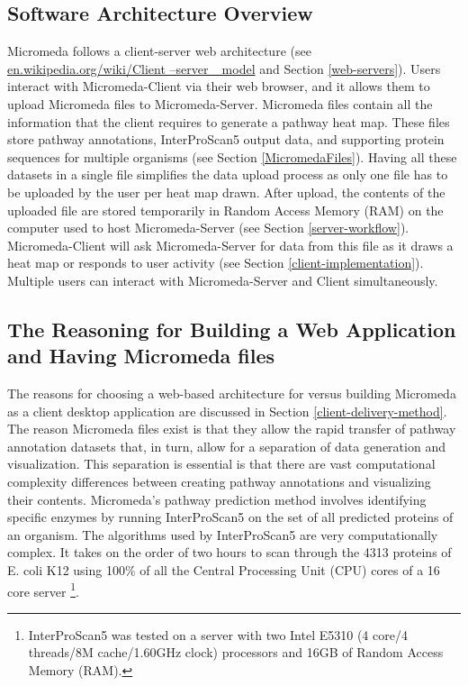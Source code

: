 \subsection{Software Architecture Overview}

Micromeda follows a client-server web architecture \cite{svobodova1985client} (see \href{en.wikipedia.org/wiki/Client–server\_model}{en.wikipedia.org/wiki/Client –server \_model} and Section \ref{web-servers}). Users interact with Micromeda-Client via their web browser, and it allows them to upload Micromeda files to Micromeda-Server. Micromeda files contain all the information that the client requires to generate a pathway heat map. These files store pathway annotations, InterProScan5 output data, and supporting protein sequences for multiple organisms (see Section \ref{MicromedaFiles}). Having all these datasets in a single file simplifies the data upload process as only one file has to be uploaded by the user per heat map drawn. After upload, the contents of the uploaded file are stored temporarily in Random Access Memory (RAM) on the computer used to host Micromeda-Server (see Section \ref{server-workflow}). Micromeda-Client will ask Micromeda-Server for data from this file as it draws a heat map or responds to user activity (see Section \ref{client-implementation}). Multiple users can interact with Micromeda-Server and Client simultaneously.

\subsection{The Reasoning for Building a Web Application and Having Micromeda files} \label{why-micromeda-files}

The reasons for choosing a web-based architecture for versus building Micromeda as a client desktop application are discussed in Section \ref{client-delivery-method}. The reason Micromeda files exist is that they allow the rapid transfer of pathway annotation datasets that, in turn, allow for a separation of data generation and visualization. This separation is essential is that there are vast computational complexity differences between creating pathway annotations and visualizing their contents. Micromeda's pathway prediction method involves identifying specific enzymes by running InterProScan5 on the set of all predicted proteins of an organism. The algorithms used by InterProScan5 are very computationally complex. It takes on the order of two hours to scan through the 4313 proteins of E. coli K12 using 100\% of all the Central Processing Unit (CPU) cores of a 16 core server \footnote{InterProScan5 was tested on a server with two Intel E5310 (4 core/4 threads/8M cache/1.60GHz clock) processors and 16GB of Random Access Memory (RAM).}.

